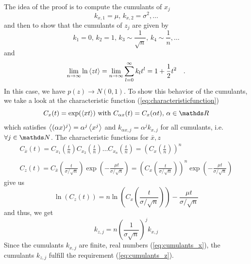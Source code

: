 \documentclass{notebook}
\begin{document}
The idea of the proof is to compute the cumulants of $x_j$
%
\begin{equation}
k_{x,1} = \mu, \, k_{x,2} = \sigma^2, \dots
\label{eq:cumulants_x}
\end{equation}
%
and then to show that the cumulants of $z_j$ are given by
%
\begin{equation}
k_1 = 0, \, k_2 = 1, \, k_3 \sim \frac{1}{\sqrt{n}}, \, k_4 \sim \frac{1}{n}, \dots
\label{eq:cumulants_z}
\end{equation}
%
and
%
\begin{equation}
\lim_{n \to \infty} \ln \expval{zt} 
= \lim_{n \to \infty} \sum_{l=0}^{\infty} k_l t^l = 1 + \frac{1}{2} t^2 \quad.
\end{equation}
%
In this case, we have $p(z) \to N(0,1)$. To show this behavior of the cumulants, we take a look at the characteristic function (\ref{eq:characteristicfunction})
%
\begin{equation}
C_x(t) = \exp(\expval{xt}) \text{ with } C_{\alpha x}(t) = C_x(\alpha t), \, \alpha \in \R
\end{equation}
%
which satisfies $\expval{(\alpha x)^j} = \alpha^j \expval{x^j}$ and $k_{\alpha x, j} = \alpha^j k_{x,j}$ for all cumulants, i.e. $\forall j \in \N$. The characteristic functions for $\bar{x}, z$
%
\begin{gather*}
	C_{\bar{x}}(t) = C_{x_1}\left( \frac{t}{n} \right) C_{x_2}\left( \frac{t}{n} \right) \dots C_{x_n}\left( \frac{t}{n} \right) = \left(C_x \left( \frac{t}{n} \right) \right)^n  \\ \\
	C_z(t) = C_{\bar{x}} \left( \frac{t}{\sigma/\sqrt{n}} \right) \exp(-\frac{\mu t}{\sigma/\sqrt{n}}) = \left( C_x \left( \frac{t}{\sigma/\sqrt{n}} \right) \right)^n  \exp(-\frac{\mu t}{\sigma/\sqrt{n}})
\end{gather*}
%
give us
%
\begin{equation}
\ln(C_z(t)) = n \ln(C_x \left( \frac{t}{\sigma/\sqrt{n}} \right)) - \frac{\mu t}{\sigma/\sqrt{n}}
\end{equation}
%
and thus, we get
%
\begin{equation}
k_{z,j} = n \left( \frac{1}{\sigma \sqrt{n}} \right)^j k_{x,j}
\end{equation}
%
Since the cumulants $k_{x,j}$ are finite, real numbers (\ref{eq:cumulants_x}), the cumulants $k_{z,j} $ fulfill the requirement (\ref{eq:cumulants_z}). 
\end{document}
